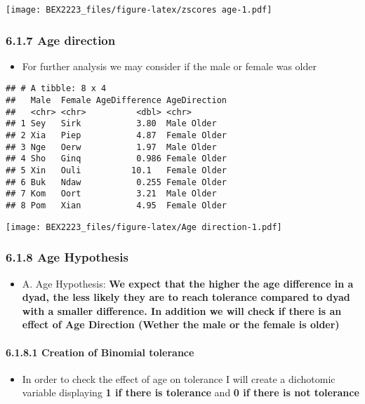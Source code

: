 \documentclass[
]{article}
\providecommand{\tightlist}{%
  \setlength{\itemsep}{0pt}\setlength{\parskip}{0pt}}
\begin{document}
\texttt{[image: BEX2223\_files/figure-latex/zscores age-1.pdf]}

\hypertarget{age-direction}{%
\subsubsection{6.1.7 Age direction}\label{age-direction}}

\begin{itemize}
\tightlist
\item
  For further analysis we may consider if the male or female was older
\end{itemize}

\begin{verbatim}
## # A tibble: 8 x 4
##   Male  Female AgeDifference AgeDirection
##   <chr> <chr>          <dbl> <chr>       
## 1 Sey   Sirk           3.80  Male Older  
## 2 Xia   Piep           4.87  Female Older
## 3 Nge   Oerw           1.97  Male Older  
## 4 Sho   Ginq           0.986 Female Older
## 5 Xin   Ouli          10.1   Female Older
## 6 Buk   Ndaw           0.255 Female Older
## 7 Kom   Oort           3.21  Male Older  
## 8 Pom   Xian           4.95  Female Older
\end{verbatim}

\texttt{[image: BEX2223\_files/figure-latex/Age direction-1.pdf]}

\hypertarget{age-hypothesis}{%
\subsubsection{6.1.8 Age Hypothesis}\label{age-hypothesis}}

\begin{itemize}
\tightlist
\item
  A. Age Hypothesis: \textbf{We expect that the higher the age
  difference in a dyad, the less likely they are to reach tolerance
  compared to dyad with a smaller difference. In addition we will check
  if there is an effect of Age Direction (Wether the male or the female
  is older)}
\end{itemize}

\hypertarget{creation-of-binomial-tolerance}{%
\paragraph{6.1.8.1 Creation of Binomial
tolerance}\label{creation-of-binomial-tolerance}}

\begin{itemize}
\tightlist
\item
  In order to check the effect of age on tolerance I will create a
  dichotomic variable displaying \textbf{1 if there is tolerance} and
  \textbf{0 if there is not tolerance}
\end{itemize}
\end{document}
